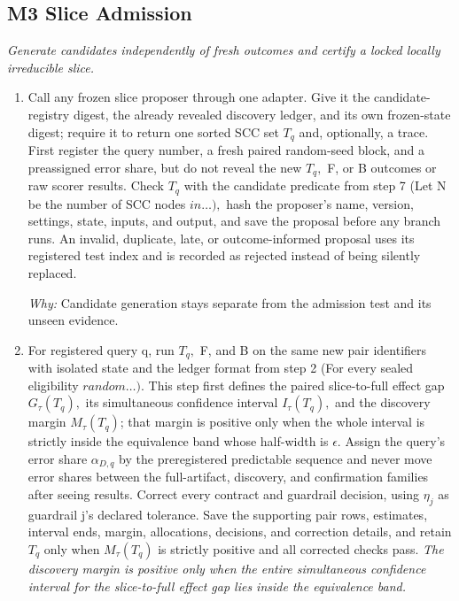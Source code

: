 \documentclass[10pt,a4paper]{article}
\begin{document}
\subsection*{M3 Slice Admission}
\emph{Generate candidates independently of fresh outcomes and certify a locked locally irreducible slice.}
\begin{enumerate}[leftmargin=*,start=8]
  \item Call any frozen slice proposer through one adapter. Give it the candidate-registry digest, the already revealed discovery ledger, and its own frozen-state digest;\allowbreak{} require it to return one sorted SCC set \(T_{q}\) and, optionally, a trace. First register the query number, a fresh paired random-seed block, and a preassigned error share, but do not reveal the new \(T_{q},\) F, or B outcomes or raw scorer results. Check \(T_{q}\) with the candidate predicate from step 7 (Let N be the number of SCC nodes \(in\dots ),\) hash the proposer's name, version, settings, state, inputs, and output, and save the proposal before any branch runs. An invalid, duplicate, late, or outcome-informed proposal uses its registered test index and is recorded as rejected instead of being silently replaced.
\par\emph{Why:} Candidate generation stays separate from the admission test and its unseen evidence.
  \item For registered query q, run \(T_{q},\) F, and B on the same new pair identifiers with isolated state and the ledger format from step 2 (For every sealed eligibility \(random\dots ).\) This step first defines the paired slice-to-full effect gap \(G_\tau (T_{q}),\) its simultaneous confidence interval \(I_\tau (T_{q}),\) and the discovery margin \(M_\tau (T_{q})\);\allowbreak{} that margin is positive only when the whole interval is strictly inside the equivalence band whose half-width is \(\epsilon .\) Assign the query's error share \(\alpha _{D,q}\) by the preregistered predictable sequence and never move error shares between the full-artifact, discovery, and confirmation families after seeing results. Correct every contract and guardrail decision, using \(\eta _{j}\) as guardrail j's declared tolerance. Save the supporting pair rows, estimates, interval ends, margin, allocations, decisions, and correction details, and retain \(T_{q}\) only when \(M_\tau (T_{q})\) is strictly positive and all corrected checks pass.
\noindent\emph{The discovery margin is positive only when the entire simultaneous confidence interval for the slice-to-full effect gap lies inside the equivalence band.}

\end{enumerate}
\end{document}
